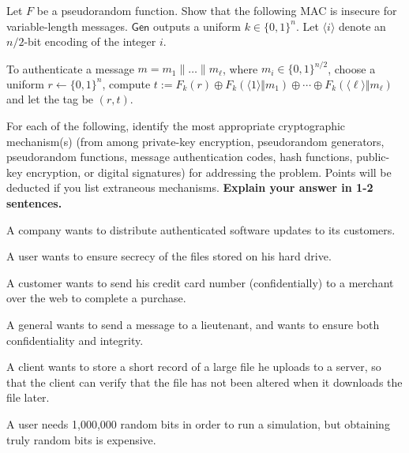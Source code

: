 \documentclass[a4paper,10pt,landscape,twocolumn]{scrartcl}
\begin{document}
\begin{exercise}

Let $F$ be a pseudorandom function. Show that the following MAC is insecure for variable-length messages. $\mathsf{Gen}$ outputs a uniform $k\in\{0,1\}^n$. Let $\langle i\rangle$ denote an $n/2$-bit encoding of the integer $i$.

To authenticate a message $m=m_1\|\dots\| m_{\ell}$, where $m_i\in\{0,1\}^{n/2}$, choose a uniform $r\gets\{0,1\}^n$, compute $t:=F_k(r)\oplus F_k(\langle 1\rangle\Vert m_1)\oplus\cdots\oplus F_k(\langle \ell\rangle\Vert m_{\ell})$ and let the tag be $( r,t)$.

\end{exercise}


\begin{exercise}
For each of the following, identify the most appropriate cryptographic
mechanism(s) (from among private-key encryption, pseudorandom generators, pseudorandom functions, message authentication codes, hash functions, public-key encryption, or digital signatures) for addressing the problem. Points will be deducted if you
list extraneous mechanisms. \textbf{Explain your answer in 1-2 sentences.}
\begin{subex}
A company wants to distribute authenticated software updates to its customers.
\end{subex}
\begin{subex}
A user wants to ensure secrecy of the files stored on his hard drive.
\end{subex}
\begin{subex}
A customer wants to send his credit card number (confidentially) to a merchant
over the web to complete a purchase.
\end{subex}
\begin{subex}
A general wants to send a message to a lieutenant, and wants to ensure both
confidentiality and integrity.
\end{subex}
\begin{subex}
A client wants to store a short record of a large file he uploads to a server, so that
the client can verify that the file has not been altered when it downloads the file
later.
\end{subex}
\begin{subex}
A user needs 1,000,000 random bits in order to run a simulation, but obtaining
truly random bits is expensive.
\end{subex}
\end{exercise}
\end{document}
